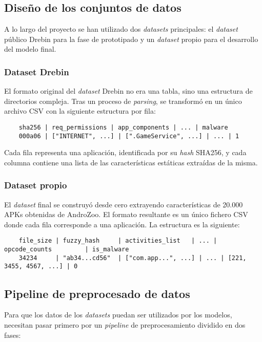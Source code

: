 \subsection{Diseño de los conjuntos de datos}
A lo largo del proyecto se han utilizado dos \textit{datasets} principales: el \textit{dataset} público Drebin para la fase de prototipado y un \textit{dataset} propio para el desarrollo del modelo final.

\subsubsection{Dataset Drebin}
El formato original del \textit{dataset} Drebin no era una tabla, sino una estructura de directorios compleja. Tras un proceso de \textit{parsing}, se transformó en un único archivo CSV con la siguiente estructura por fila:

\begin{verbatim}
	sha256 | req_permissions | app_components | ... | malware
	000a06 | ["INTERNET", ...] | [".GameService", ...] | ... | 1
\end{verbatim}

Cada fila representa una aplicación, identificada por su \textit{hash} SHA256, y cada columna contiene una lista de las características estáticas extraídas de la misma.

\subsubsection{Dataset propio}
El \textit{dataset} final se construyó desde cero extrayendo características de 20.000 APKs obtenidas de AndroZoo. El formato resultante es un único fichero CSV donde cada fila corresponde a una aplicación. La estructura es la siguiente:
\begin{verbatim}
	file_size | fuzzy_hash     | activities_list   | ... | opcode_counts         | is_malware
	34234     | "ab34...cd56"  | ["com.app...", ...] | ... | [221, 3455, 4567, ...] | 0
\end{verbatim}

\subsection{Pipeline de preprocesado de datos}
Para que los datos de los \textit{datasets} puedan ser utilizados por los modelos, necesitan pasar primero por un \textit{pipeline} de preprocesamiento dividido en dos fases:

